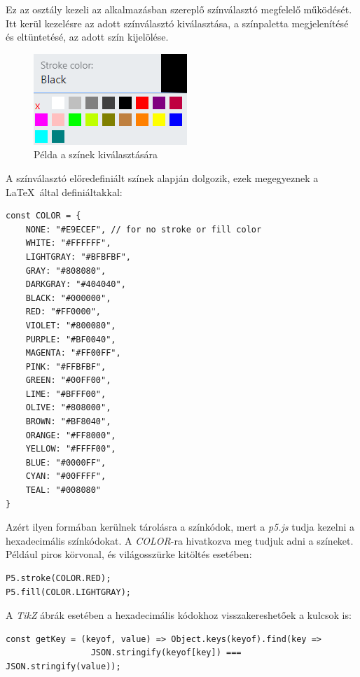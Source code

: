 Ez az osztály kezeli az alkalmazásban szereplő színválasztó megfelelő működését. Itt kerül kezelésre az adott színválasztó kiválasztása, a színpaletta megjelenítésé és eltüntetésé, az adott szín kijelölése. 

\begin{figure}[!h]
	\centering
	\label{fig:cp2}
	\includegraphics[]{images/colorpicker.png}
	\caption{Példa a színek kiválasztására}
\end{figure}

A színválasztó előredefiniált színek alapján dolgozik, ezek megegyeznek a \LaTeX\ által definiáltakkal:

\begin{lstlisting}[style=es6]
const COLOR = {
	NONE: "#E9ECEF", // for no stroke or fill color
	WHITE: "#FFFFFF",
	LIGHTGRAY: "#BFBFBF",
	GRAY: "#808080",
	DARKGRAY: "#404040",
	BLACK: "#000000",
	RED: "#FF0000",
	VIOLET: "#800080",
	PURPLE: "#BF0040",
	MAGENTA: "#FF00FF",
	PINK: "#FFBFBF",
	GREEN: "#00FF00",
	LIME: "#BFFF00",
	OLIVE: "#808000",
	BROWN: "#BF8040",
	ORANGE: "#FF8000",
	YELLOW: "#FFFF00",
	BLUE: "#0000FF",
	CYAN: "#00FFFF",
	TEAL: "#008080"
}
\end{lstlisting}

Azért ilyen formában kerülnek tárolásra a színkódok, mert a \textit{p5.js} tudja kezelni a hexadecimális színkódokat. A \textit{COLOR}-ra hivatkozva meg tudjuk adni a színeket. Például piros körvonal, és világosszürke kitöltés esetében:
\begin{lstlisting}[style=es6, morekeywords={P5, COLOR}]
P5.stroke(COLOR.RED);
P5.fill(COLOR.LIGHTGRAY);
\end{lstlisting}

A \textit{TikZ} ábrák esetében a hexadecimális kódokhoz visszakereshetőek a kulcsok is:

\begin{lstlisting}[style=es6, morekeywords={JSON}]
const getKey = (keyof, value) => Object.keys(keyof).find(key => 
                 JSON.stringify(keyof[key]) === JSON.stringify(value));
\end{lstlisting}

